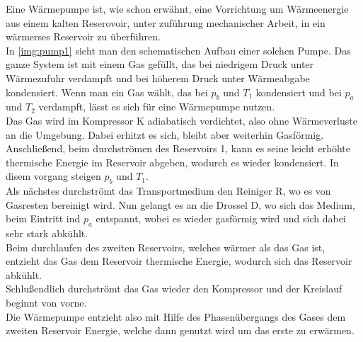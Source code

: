 Eine Wärmepumpe ist, wie schon erwähnt, eine Vorrichtung um Wärmeenergie aus einem kalten 
Reserovoir, unter zuführung mechanischer Arbeit, in ein wärmerses Reservoir zu überführen.\\
In \ref{img:pump1} sieht man den schematischen Aufbau einer solchen Pumpe.
Das ganze System ist mit einem Gas gefüllt, das bei niedrigem Druck unter Wärmezufuhr verdampft
und bei höherem Druck unter Wärmeabgabe kondensiert.
Wenn man ein Gas wählt, das bei $p_b$ und $T_1$ kondensiert und bei $p_a$ und $T_2$ verdampft,
lässt es sich für eine Wärmepumpe nutzen.\\
Das Gas wird im Kompressor K adiabatisch verdichtet, also ohne Wärmeverluste an die Umgebung. 
Dabei erhitzt es sich, bleibt aber weiterhin Gasförmig. 
Anschließend, beim durchströmen des Reservoirs 1, kann es seine leicht erhöhte thermische Energie
im Reservoir abgeben, wodurch es wieder kondensiert.
In disem vorgang steigen $p_b$ und $T_1$.\\
Als nächstes durchströmt das Transportmedium den Reiniger R, wo es von Gasresten bereinigt wird.
Nun gelangt es an die Drossel D, wo sich das Medium, beim Eintritt ind $p_a$ entspannt, wobei es 
wieder gasförmig wird und sich dabei sehr stark abkühlt.\\
Beim durchlaufen des zweiten Reservoirs, welches wärmer als das Gas ist, entzieht das Gas 
dem Reservoir thermische Energie, wodurch sich das Reservoir abkühlt.\\
Schlußendlich durchströmt das Gas wieder den Kompressor und der Kreislauf beginnt von vorne.\\
Die Wärmepumpe entzieht also mit Hilfe des Phasenübergangs des Gases dem zweiten Reservoir Energie, welche dann 
genutzt wird um das erste zu erwärmen.




